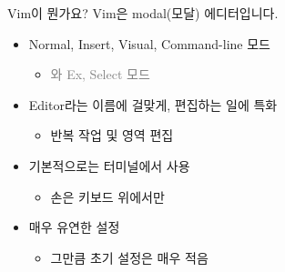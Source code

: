 \documentclass{beamer}
\begin{document}
\begin{frame}{Vim이 뭔가요?}
  \pause\centering\alert{\Large Vim은 modal(모달) 에디터입니다.}\pause\vpad
  \begin{itemize}
    \item Normal, Insert, Visual, Command-line 모드
      \begin{itemize}
        \item \textcolor{gray}{와 Ex, Select 모드}
      \end{itemize}
    \pause
    \item \alert{Edit}or라는 이름에 걸맞게, 편집하는 일에 특화
      \begin{itemize}
        \item 반복 작업 및 영역 편집
      \end{itemize}
    \pause
    \item 기본적으로는 터미널에서 사용
      \begin{itemize}
        \item 손은 키보드 위에서만
      \end{itemize}
    \pause
    \item \alert{매우 유연한 설정}
      \begin{itemize}
        \item 그만큼 초기 설정은 매우 적음
      \end{itemize}
  \end{itemize}
\end{frame}
\end{document}
